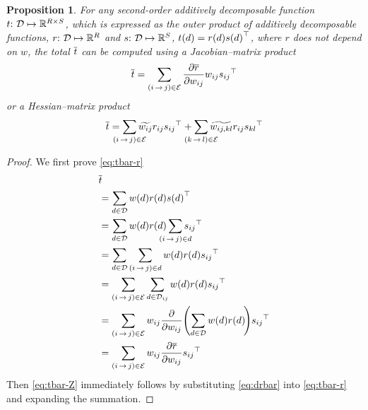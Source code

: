 \documentclass[11pt,a4paper]{article}
\newtheorem{prop}{Proposition}
\theoremstyle{definition}
\begin{document}
\begin{prop}
\label{prop:tbar}
For any second-order additively decomposable function $t{:}\,\,{\mathcal{D}} \mapsto \mathbb{R}^{{R \times S}}$, which is expressed as the outer product of additively decomposable functions,
$r{:}\,\,{\mathcal{D}} \mapsto \mathbb{R}^{{R}}$ and
$s{:}\,\,{\mathcal{D}} \mapsto \mathbb{R}^{{S}}$, 
${t({d})} = {r({d})} {s({d})}^{\top}$, where $r$ does not depend on $w$,
the total ${\overline{t}}$ can be computed using a Jacobian--matrix product
\begin{equation}\label{eq:tbar-r}
    {\overline{t}} = \sum_{{(i\,{\rightarrow}\,j)}\in{\mathcal{E}}}\frac{\partial {\overline{r}}}{\partial {w_{ij}}}{w_{ij}}{s_{ij}}^{\top}
\end{equation}
or a Hessian--matrix product
\begin{align}
    \tbar = \smashoperator{\sum_{\edgeij\in\edges}}\totalw{ij}\redge{ij}\sedge{ij}^{\top} + \smashoperator{\sum_{\edgekl\in\edges}}\totalw{ij,kl}\redge{ij}\sedge{kl}^{\top}
    \label{eq:tbar-Z}
\end{align}
\end{prop}
\begin{proof}
We first prove \cref{eq:tbar-r}
\begin{align*}
    & \tbar \\
    &= \sum_{\tree\in\st}\wtree{\tree}\rtree{\tree}\stree{\tree}^{\top} \\
    &= \sum_{\tree\in\st}\wtree{\tree}\rtree{\tree}\smashoperator{\sum_{\edgeij\in \tree}}\sedge{ij}^{\top} \\
    &= \sum_{\tree\in\st}\sum_{\edgeij\in \tree}\wtree{\tree}\rtree{\tree}\sedge{ij}^{\top} \\
    &= \sum_{\edgeij\in\edges}\sum_{\tree\in\inc{ij}}\wtree{\tree}\rtree{\tree}\sedge{ij}^{\top} \\
    &= \sum_{\edgeij\in\edges} \wedge{ij}\frac{\partial}{\partial \wedge{ij}} \!\left(  \sum_{\tree\in\st}\wtree{\tree}\rtree{\tree}\!\right)\!\sedge{ij}^{\top} \\
    &= \sum_{\edgeij\in\edges}\wedge{ij}\frac{\partial \rbar}{\partial \wedge{ij}}\sedge{ij}^{\top}
\end{align*}
Then \cref{eq:tbar-Z} immediately follows by substituting \cref{eq:drbar} into  \cref{eq:tbar-r} and expanding the summation.
\end{proof}
\end{document}
